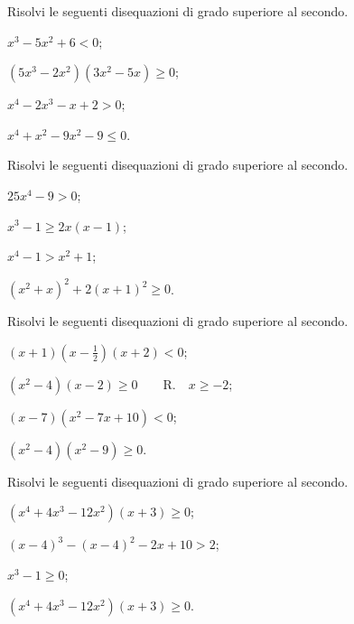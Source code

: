  \begin{esercizio}[\Ast]
\label{ese:4.41}
Risolvi le seguenti disequazioni di grado superiore al secondo.
\begin{multicols}{2}
\begin{enumeratea}
\item $x^3-5x^2+6<0$;
\item $\left(5x^3-2x^2\right)\left(3x^2-5x\right)\ge 0$;
\item $x^4-2x^3-x+2>0$;
\item $x^4+x^2-9x^2-9\le 0$.
\end{enumeratea}
\end{multicols}
 \end{esercizio}

\begin{esercizio}[\Ast]
\label{ese:4.42}
Risolvi le seguenti disequazioni di grado superiore al secondo.
\begin{multicols}{2}
\begin{enumeratea}
\item $25x^4-9>0$;
\item $x^3-1\ge 2x(x-1)$;
\item $x^4-1>x^2+1$;
\item $\left(x^2+x\right)^2+2\left(x+1\right)^2\ge 0$.
\end{enumeratea}
\end{multicols}
\end{esercizio}

\begin{esercizio}[\Ast]
 \label{ese:4.43}
Risolvi le seguenti disequazioni di grado superiore al secondo.
\begin{multicols}{2}
\begin{enumeratea}
\item $(x+1)\left(x-\frac 1 2\right)(x+2)<0$;
\item $\left(x^2-4\right)(x-2)\ge 0$~~~~R.~~$x\ge -2$;
\item $(x-7)\left(x^2-7x+10\right)<0$;
\item $\left(x^2-4\right)\left(x^2-9\right)\ge 0$.
\end{enumeratea}
\end{multicols}
\end{esercizio}

\begin{esercizio}[\Ast]
 \label{ese:4.44}
Risolvi le seguenti disequazioni di grado superiore al secondo.
\begin{multicols}{2}
\begin{enumeratea}
\item $\left(x^4+4x^3-12x^2\right)\left(x+3\right)\ge 0$;
\item $(x-4)^3-(x-4)^2-2x+10>2$;
\item $x^3-1\ge 0$;
\item $\left(x^4+4x^3-12x^2\right)\left(x+3\right)\ge 0$.
\end{enumeratea}
\end{multicols}
\end{esercizio}

